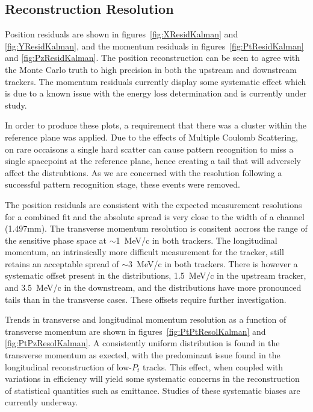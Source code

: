  \subsection{Reconstruction Resolution}
  \label{sec:performance:resolutions}
  
  Position residuals are shown in figures~\ref{fig:XResidKalman} and \ref{fig:YResidKalman}, and the momentum residuals in figures~\ref{fig:PtResidKalman} and \ref{fig:PzResidKalman}.  The position reconstruction can be seen to agree with the Monte Carlo truth to high precision in both the upstream and downstream trackers. The momentum residuals currently display some systematic effect which is due to a known issue with the energy loss determination and is currently under study.
  
  In order to produce these plots, a requirement that there was a cluster within the reference plane was applied. Due to the effects of Multiple Coulomb Scattering, on rare occaisons a single hard scatter can cause pattern recognition to miss a single spacepoint at the reference plane, hence creating a tail that will adversely affect the distrubtions. As we are concerned with the resolution following a successful pattern recognition stage, these events were removed.
  
  The position residuals are consistent with the expected measurement resolutions for a combined fit and the absolute spread is very close to the width of a channel (1.497mm). The transverse momentum resolution is consitent accross the range of the sensitive phase space at $\sim$1~MeV/c in both trackers. The longitudinal momentum, an intrinsically more difficult measurement for the tracker, still retains an acceptable spread of $\sim3$~MeV/c in both trackers. There is however a systematic offset present in the distributions, 1.5~MeV/c in the upstream tracker, and 3.5~MeV/c in the downstream, and the distributions have more pronounced tails than in the transverse cases. These offsets require further investigation.
  
  Trends in transverse and longitudinal momentum resolution as a function of transverse momentum are shown in figures~\ref{fig:PtPtResolKalman} and \ref{fig:PtPzResolKalman}. A consistently uniform distribution is found in the transverse momentum as exected, with the predominant issue found in the longitudinal reconstruction of low-$P_t$ tracks. This effect, when coupled with variations in efficiency will yield some systematic concerns in the reconstruction of statistical quantities such as emittance. Studies of these systematic biases are currently underway.

